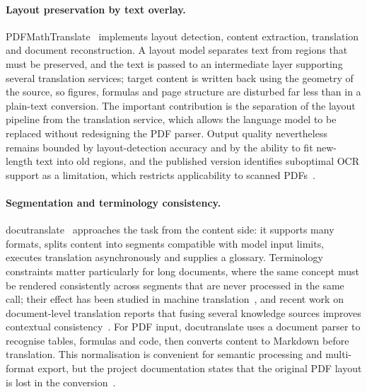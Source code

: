\paragraph{Layout preservation by text overlay.} PDFMathTranslate~\citep{pdf2zh}
implements layout detection, content extraction, translation and document
reconstruction. A layout model separates text from regions that must be
preserved, and the text is passed to an intermediate layer supporting several
translation services; target content is written back using the geometry of the
source, so figures, formulas and page structure are disturbed far less than in
a plain-text conversion. The important contribution is the separation of the
layout pipeline from the translation service, which allows the language model to
be replaced without redesigning the PDF parser. Output quality nevertheless
remains bounded by layout-detection accuracy and by the ability to fit
new-length text into old regions, and the published version identifies
suboptimal OCR support as a limitation, which restricts applicability to
scanned PDFs~\citep{pdf2zh}.

\paragraph{Segmentation and terminology consistency.}
docutranslate~\citep{docutranslate} approaches the task from the content side:
it supports many formats, splits content into segments compatible with model
input limits, executes translation asynchronously and supplies a glossary.
Terminology constraints matter particularly for long documents, where the same
concept must be rendered consistently across segments that are never processed
in the same call; their effect has been studied in machine
translation~\citep{terminology-mt}, and recent work on document-level
translation reports that fusing several knowledge sources improves contextual
consistency~\citep{doc-mt-multi-knowledge}. For PDF input, docutranslate uses a
document parser to recognise tables, formulas and code, then converts content to
Markdown before translation. This normalisation is convenient for semantic
processing and multi-format export, but the project documentation states that
the original PDF layout is lost in the conversion~\citep{docutranslate}.

